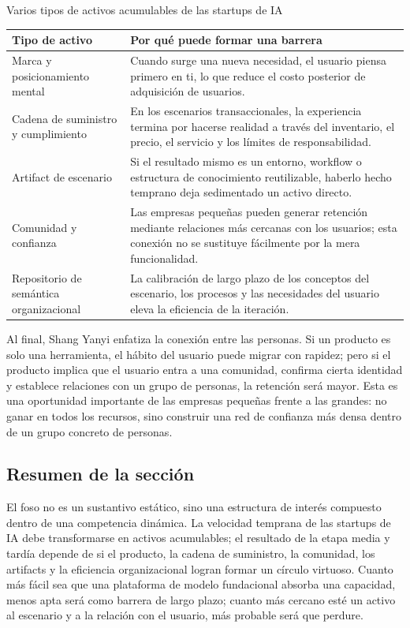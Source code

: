 \documentclass[a4paper]{article}
\begin{document}
\begin{knowledgebox}{Varios tipos de activos acumulables de las startups de IA}
\begin{tabularx}{\textwidth}{>{\raggedright\arraybackslash}p{} Y}
\toprule
Tipo de activo & Por qué puede formar una barrera \\
\midrule
Marca y posicionamiento mental & Cuando surge una nueva necesidad, el usuario piensa primero en ti, lo que reduce el costo posterior de adquisición de usuarios. \\
Cadena de suministro y cumplimiento & En los escenarios transaccionales, la experiencia termina por hacerse realidad a través del inventario, el precio, el servicio y los límites de responsabilidad. \\
Artifact de escenario & Si el resultado mismo es un entorno, workflow o estructura de conocimiento reutilizable, haberlo hecho temprano deja sedimentado un activo directo. \\
Comunidad y confianza & Las empresas pequeñas pueden generar retención mediante relaciones más cercanas con los usuarios; esta conexión no se sustituye fácilmente por la mera funcionalidad. \\
Repositorio de semántica organizacional & La calibración de largo plazo de los conceptos del escenario, los procesos y las necesidades del usuario eleva la eficiencia de la iteración. \\
\bottomrule
\end{tabularx}
\end{knowledgebox}

Al final, Shang Yanyi enfatiza la conexión entre las personas. Si un producto es solo una herramienta, el hábito del usuario puede migrar con rapidez; pero si el producto implica que el usuario entra a una comunidad, confirma cierta identidad y establece relaciones con un grupo de personas, la retención será mayor. Esta es una oportunidad importante de las empresas pequeñas frente a las grandes: no ganar en todos los recursos, sino construir una red de confianza más densa dentro de un grupo concreto de personas.

\subsection{Resumen de la sección}

El foso no es un sustantivo estático, sino una estructura de interés compuesto dentro de una competencia dinámica. La velocidad temprana de las startups de IA debe transformarse en activos acumulables; el resultado de la etapa media y tardía depende de si el producto, la cadena de suministro, la comunidad, los artifacts y la eficiencia organizacional logran formar un círculo virtuoso. Cuanto más fácil sea que una plataforma de modelo fundacional absorba una capacidad, menos apta será como barrera de largo plazo; cuanto más cercano esté un activo al escenario y a la relación con el usuario, más probable será que perdure.
\end{document}
